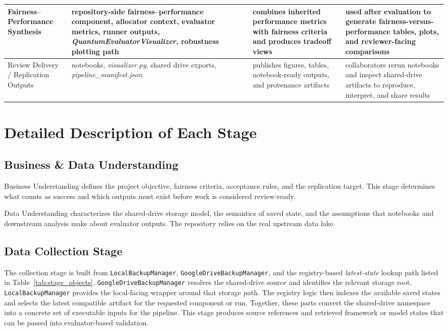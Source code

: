 \documentclass{IEEEtran}
\begin{document}
\begin{table}[!t]
\begin{tabularx}{\textwidth}{>{\raggedright\arraybackslash}p{2.7cm} >{\raggedright\arraybackslash}p{4.7cm} >{\raggedright\arraybackslash}p{4.3cm} >{\raggedright\arraybackslash}p{5.0cm}}
\rowcolor{phase4purple!14}
Fairness--Performance Synthesis & repository-side fairness--performance component, allocator context, evaluator metrics, runner outputs, \textit{QuantumEvaluatorVisualizer}, robustness plotting path & combines inherited performance metrics with fairness criteria and produces tradeoff views & used after evaluation to generate fairness-versus-performance tables, plots, and reviewer-facing comparisons \\
\midrule

\rowcolor{phase4purple!10}
Review Delivery / Replication Outputs & notebooks, \textit{visualizer.py}, shared drive exports, \textit{pipeline\_manifest.json} & publishes figures, tables, notebook-ready outputs, and provenance artifacts & collaborators rerun notebooks and inspect shared-drive artifacts to reproduce, interpret, and share results \\
\bottomrule
\end{tabularx}
\end{table}

\section{Detailed Description of Each Stage}

\subsection{Business \& Data Understanding}
Business Understanding defines the project objective, fairness criteria, acceptance rules, and the replication target. This stage determines what counts as success and which outputs must exist before work is considered review-ready.

Data Understanding characterizes the shared-drive storage model, the semantics of saved state, and the assumptions that notebooks and downstream analysis make about evaluator outputs. The repository relies on the real upstream data lake.

\subsection{Data Collection Stage}
The collection stage is built from \texttt{LocalBackupManager}, \texttt{GoogleDriveBackupManager}, and the registry-based \textit{latest-state} lookup path listed in Table~\ref{tab:stage_objects}.
\texttt{GoogleDriveBackupManager} resolves the shared-drive source and identifies the relevant storage root. \texttt{LocalBackupManager}
provides the local-facing wrapper around that storage path. The registry logic then indexes the available saved states and selects the latest compatible artifact for the requested component or run. Together, these parts convert the shared-drive namespace into a concrete set of executable inputs for the pipeline. This stage produces source references and retrieved framework or model states that can be passed into evaluator-based validation.
\end{document}
